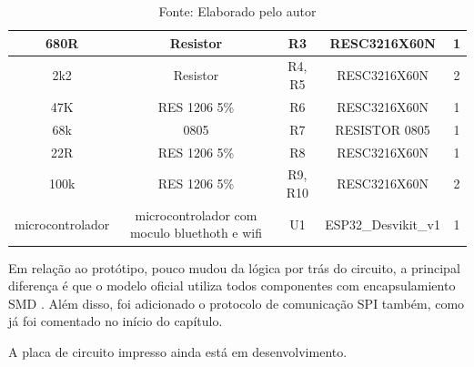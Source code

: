 \documentclass[../delivery_hospital_report.tex]{subfiles}
\begin{document}
\begin{table}[h]
\begin{adjustbox}{width=\columnwidth,center}
\begin{tabular}{|c|c|c|c|c|}
680R             & Resistor                                       & R3                         & RESC3216X60N             & 1        \\ \hline
2k2              & Resistor                                       & R4, R5                     & RESC3216X60N             & 2        \\ \hline
47K              & RES 1206 5\%                                   & R6                         & RESC3216X60N             & 1        \\ \hline
68k              & 0805                                           & R7                         & RESISTOR 0805            & 1        \\ \hline
22R              & RES 1206 5\%                                   & R8                         & RESC3216X60N             & 1        \\ \hline
100k             & RES 1206 5\%                                   & R9, R10                    & RESC3216X60N             & 2        \\ \hline
microcontrolador & microcontrolador com   moculo bluethoth e wifi & U1                         & ESP32\_Desvikit\_v1      & 1        \\ \hline

\end{tabular}
\end{adjustbox}
\centering
\caption*{Fonte: Elaborado pelo autor}
\label{Componentes Utilizados na placa de Controle}
\end{table}

Em relação ao protótipo, pouco mudou da lógica por trás do circuito, a principal diferença é que o modelo oficial utiliza todos componentes com encapsulamiento SMD \cite{SMD_def}. Além disso, foi adicionado o protocolo de comunicação SPI também, como já foi comentado no início do capítulo.

A placa de circuito impresso ainda está em desenvolvimento.

\end{document}
